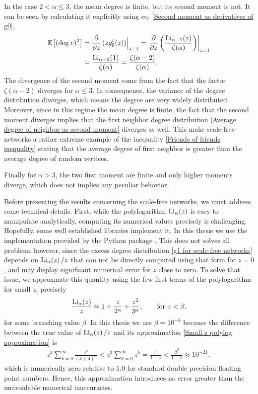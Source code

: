 \documentclass[
11pt, %
american, %
singlespacing, %
final, %
nolistspacing, %
liststotoc, %
headsepline, %
]{MastersDoctoralThesis} %
\begin{document}
In the case $2 < \alpha \leq 3$, the mean degree is finite, but its second moment is not. It can be seen by calculating it explicitly using eq. \eqref{Second moment as derivatives of g0},
\begin{align}
	\mathbb{E}_{}\!\left[ (\mathrm{deg}_{}\, v)^2 \right] &= \frac{\partial}{\partial z}\left(z g'_0(z)\right)\Bigr|_{z = 1} = \left. \frac{\partial}{\partial z}\left(\frac{\mathrm{Li}_{\alpha - 1}\!\left(z\right)}{\zeta(\alpha)} \right)\right\rvert_{z = 1} \\
		&= \frac{\mathrm{Li}_{\alpha - 2}\!\left(1\right)}{\zeta(\alpha)} = \frac{\zeta(\alpha - 2)}{\zeta(\alpha)}.
\end{align} 
The divergence of the second moment come from the fact that the factor $\zeta(\alpha - 2)$ diverges for $\alpha \leq 3$. In consequence, the variance of the degree distribution diverges, which means the degree are very widely distributed. Moreover, since in this regime the mean degree is finite, the fact that the second moment diverges implies that the first neighbor degree distribution \eqref{Average degree of neighbor as second moment} diverges as well. This make scale-free networks a rather extreme example of the inequality \eqref{Friends of friends inequality} stating that the average degree of first neighbor is greater than the average degree of random vertices.

Finally for $\alpha > 3$, the two first moment are finite and only higher moments diverge, which does not implies any peculiar behavior.

Before presenting the results concerning the scale-free networks, we must address some technical details. First, while the polylogarithm $\mathrm{Li}_{\alpha}\!\left(z\right)$ is easy to manipulate analytically, computing its numerical values precisely is challenging. Hopefully, some well established libraries implement it. In this thesis we use the implementation provided by the  Python package \cite{mpmath}. This does not solves all problems however, since the excess degree distribution \eqref{g1 for scale-free networks} depends on $\mathrm{Li}_{\alpha}\!\left(z\right)/z$ that can not be directly computed using that form for $z = 0$, and may display significant numerical error for $z$ close to zero. To solve that issue, we approxmate this quantity using the few first terms of the polylogarithm for small $z$, precisely
\begin{align}
	\frac{\mathrm{Li}_{\alpha}\!\left(z\right)}{z} \approx 1 + \frac{z}{2^\alpha} + \frac{z^2}{3^\alpha}, \qquad \text{for } z < \beta, \label{Small z polylog approximation}
\end{align}
for some branching value $\beta$. In this thesis we use $\beta = 10^{-8}$ because the difference between the true value of $\mathrm{Li}_{\alpha}\!\left(z\right)/z$ and its approximation \eqref{Small z polylog approximation} is
\begin{align}
	z^3 \sum_{k=0}^\infty \frac{z^k}{(k + 4)^\alpha} < z^3 \sum_{k=0}^\infty z^k = \frac{z^3}{1 - z} < \frac{\beta^3}{1 - \beta} \approx 10^{-24},
\end{align}
which is numerically zero relative to $1.0$ for standard double precision floating point numbers. Hence, this approximation introduces no error greater than the unavoidable numerical inaccuracies.
\end{document}
